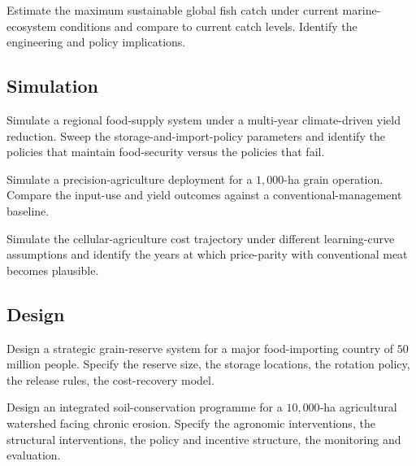 \begin{exercise}
Estimate the maximum sustainable global fish catch under current marine-ecosystem conditions and compare to current catch levels. Identify the engineering and policy implications.
\end{exercise}

\subsection*{Simulation}

\begin{exercise}
Simulate a regional food-supply system under a multi-year climate-driven yield reduction. Sweep the storage-and-import-policy parameters and identify the policies that maintain food-security versus the policies that fail.
\end{exercise}

\begin{exercise}
Simulate a precision-agriculture deployment for a $1{,}000$-ha grain operation. Compare the input-use and yield outcomes against a conventional-management baseline.
\end{exercise}

\begin{exercise}
Simulate the cellular-agriculture cost trajectory under different learning-curve assumptions and identify the years at which price-parity with conventional meat becomes plausible.
\end{exercise}

\subsection*{Design}

\begin{exercise}
Design a strategic grain-reserve system for a major food-importing country of $50$ million people. Specify the reserve size, the storage locations, the rotation policy, the release rules, the cost-recovery model.
\end{exercise}

\begin{exercise}
Design an integrated soil-conservation programme for a $10{,}000$-ha agricultural watershed facing chronic erosion. Specify the agronomic interventions, the structural interventions, the policy and incentive structure, the monitoring and evaluation.
\end{exercise}

